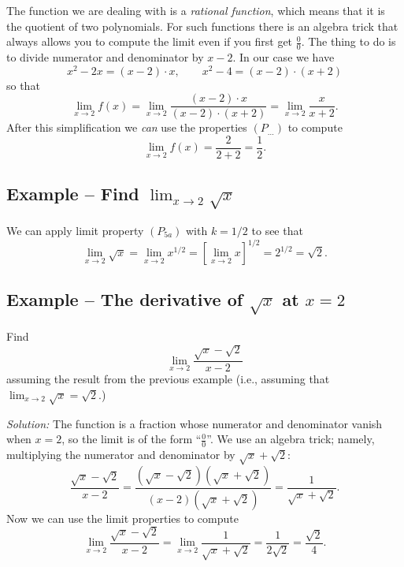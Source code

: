 The function we are dealing with is a \emph{rational function}, which means
that it is the quotient of two polynomials.  For such functions there is an
algebra trick that always allows you to compute the limit even if you
first get $\frac 00$.  The thing to do is to divide numerator and
denominator by $x-2$.  In our case we have
\[
x^2-2x = (x-2)\cdot x, \qquad x^2-4 = (x-2)\cdot (x+2)
\]
so that
\[
\lim_{x\to2} f(x) =\lim_{x\to2} \frac{(x-2)\cdot x } {(x-2)\cdot (x+2)} =
\lim_{x\to2} \frac{x}{x+2}.
\]
After this simplification we \emph{can} use the properties $(P_{\ldots})$
to compute
\[
\lim_{x\to2} f(x) = \frac{2}{2+2} = \frac12.
\]

\subsection{Example -- Find $\lim_{x\to 2}\sqrt x$} 
\label{ex:limit-of-sqrt-at-2}
  We can apply limit property $(P_{5a})$ with $k=1/2$ to see that
\[
  \lim_{x\to2} \sqrt{x} = \lim_{x\to2} x^{1/2} = [\lim_{x\to2} x]^{1/2} =
  2^{1/2} = \sqrt{2}.
\]

\subsection{Example -- The derivative of $\sqrt x$ at $x=2$} 
Find
\[
\lim_{x\to2}\frac{\sqrt x-\sqrt2}{x-2}
\]
assuming the result from the previous example (i.e., assuming that
$\lim_{x\to2}\sqrt x = \sqrt2$.)

\textit{Solution: } The function is a fraction whose numerator and
denominator vanish when $x=2$, so the limit is of the form ``$\frac00$''.
We use an algebra trick; namely, multiplying the numerator and
denominator by $\sqrt{x}+\sqrt{2}$:
\[
\frac{\sqrt x-\sqrt2}{x-2}
= \frac{(\sqrt x-\sqrt2)(\sqrt{x}+\sqrt{2})}{(x-2)(\sqrt
  x+\sqrt2)} =\frac{1}{\sqrt x+\sqrt2}.
\]
Now we can use the limit properties to compute
\[
\lim_{x\to2} \frac{\sqrt x-\sqrt 2}{x-2} = \lim_{x\to2} \frac{1}{\sqrt
  x+\sqrt 2} =\frac1{2\sqrt2} =\frac{\sqrt2}4.
\]



